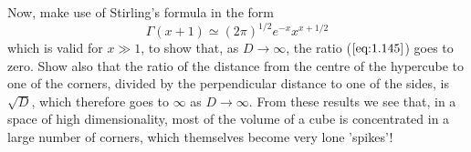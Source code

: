Now, make use of Stirling's formula in the form
\begin{equation*}
    \Gamma(x + 1) \simeq (2\pi)^{1/2} e^{-x} x^{x + 1/2}
    \tag{1.146}\label{eq:1.146}
\end{equation*}
which is valid for $x \gg 1$, to show that, as $D \to \infty$, the
ratio ($\ref{eq:1.145}$) goes to zero. Show also that the ratio
of the distance from the centre of the hypercube to one
of the corners, divided by the perpendicular distance to one of the
sides, is $\sqrt{D}$, which therefore goes to $\infty$ as $D \to \infty$.
From these results we see that, in a space of high dimensionality,
most of the volume of a cube is concentrated in a large number
of corners, which themselves become very lone 'spikes'!

\vspace{1em}

